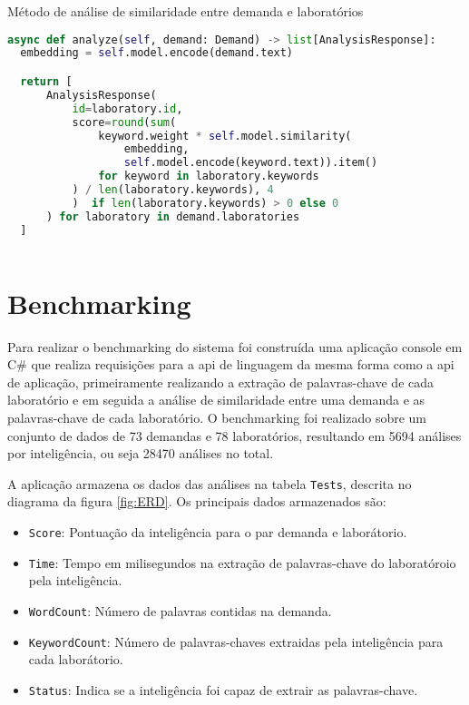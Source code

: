 \begin{sourcecode}[H]
  \caption{\label{codigo:analyze-demand}Método de análise de similaridade entre demanda e laboratórios}
  \begin{lstlisting}[frame=single, language=Python]
async def analyze(self, demand: Demand) -> list[AnalysisResponse]:
  embedding = self.model.encode(demand.text)

  return [
      AnalysisResponse(
          id=laboratory.id, 
          score=round(sum(
              keyword.weight * self.model.similarity(
                  embedding, 
                  self.model.encode(keyword.text)).item()
              for keyword in laboratory.keywords
          ) / len(laboratory.keywords), 4
          )  if len(laboratory.keywords) > 0 else 0
      ) for laboratory in demand.laboratories
  ]
\end{lstlisting}
  \fonte{}
\end{sourcecode}

\section{Benchmarking}\label{sec:benchmarking}

Para realizar o benchmarking do sistema foi construída uma aplicação console em C\# que realiza requisições para a \gls{api} de linguagem da mesma forma como a \gls{api} de aplicação, primeiramente realizando a extração de palavras-chave de cada laboratório e em seguida a análise de similaridade entre uma demanda e as palavras-chave de cada laboratório. O benchmarking foi realizado sobre um conjunto de dados de 73 demandas e 78 laboratórios, resultando em 5694 análises por inteligência, ou seja 28470 análises no total.

A aplicação armazena os dados das análises na tabela \texttt{Tests}, descrita no diagrama da figura \ref{fig:ERD}. Os principais dados armazenados são:

\begin{itemize}
  \item \texttt{Score}: Pontuação da inteligência para o par demanda e laborátorio.
  \item \texttt{Time}: Tempo em milisegundos na extração de palavras-chave do laboratóroio pela inteligência.
  \item \texttt{WordCount}: Número de palavras contidas na demanda.
  \item \texttt{KeywordCount}: Número de palavras-chaves extraidas pela inteligência para cada laborátorio.
  \item \texttt{Status}: Indica se a inteligência foi capaz de extrair as palavras-chave.
\end{itemize}

